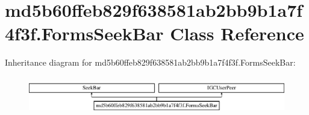 \hypertarget{classmd5b60ffeb829f638581ab2bb9b1a7f4f3f_1_1FormsSeekBar}{}\section{md5b60ffeb829f638581ab2bb9b1a7f4f3f.\+Forms\+Seek\+Bar Class Reference}
\label{classmd5b60ffeb829f638581ab2bb9b1a7f4f3f_1_1FormsSeekBar}
Inheritance diagram for md5b60ffeb829f638581ab2bb9b1a7f4f3f.\+Forms\+Seek\+Bar\+:\begin{figure}[H]
\begin{center}
\leavevmode
\includegraphics[height=1.666667cm]{classmd5b60ffeb829f638581ab2bb9b1a7f4f3f_1_1FormsSeekBar}
\end{center}
\end{figure}
